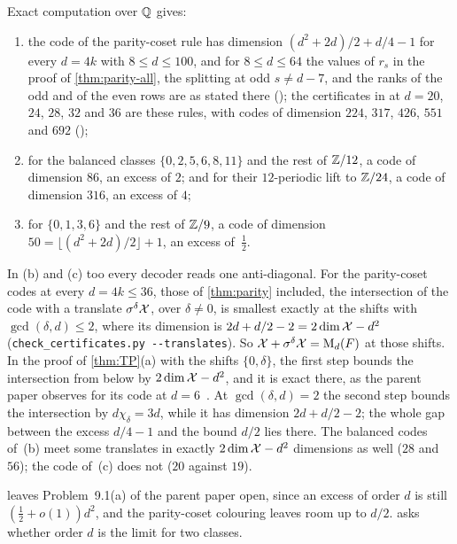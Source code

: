 \begin{remark}\label{rem:parity-numerical}
Exact computation over $\mathbb{Q}$ gives:
\begin{enumerate}[label=(\alph*),leftmargin=2em]
\item the code of the parity-coset rule has dimension $(d^2+2d)/2+d/4-1$ for every $d=4k$ with $8\le d\le100$, and
for $8\le d\le64$ the values of $r_s$ in the proof of \cref{thm:parity-all}, the splitting at odd $s\ne d-7$, and the
ranks of the odd and of the even rows are as stated there (); the certificates in  at $d=20$, $24$, $28$,
$32$ and $36$ are these rules, with codes of dimension $224$, $317$, $426$, $551$ and $692$
();
\item for the balanced classes $\{0,2,5,6,8,11\}$ and the rest of $\mathbb{Z}/12$, a code of dimension $86$, an excess of $2$;
and for their $12$-periodic lift to $\mathbb{Z}/24$, a code of dimension $316$, an excess of $4$;
\item for $\{0,1,3,6\}$ and the rest of $\mathbb{Z}/9$, a code of dimension $50=\lfloor(d^2+2d)/2\rfloor+1$, an excess
of~$\frac12$.
\end{enumerate}
In (b) and (c) too every decoder reads one anti-diagonal. For the parity-coset codes at every $d=4k\le36$, those of
\cref{thm:parity} included, the intersection of the code with a translate $\sigma^\delta\mathcal{X}$, over $\delta\ne0$, is
smallest exactly at the shifts with $\gcd(\delta,d)\le2$, where its dimension is $2d+d/2-2=2\dim\mathcal{X}-d^2$
(\texttt{check\_certificates.py -{}-translates}). So $\mathcal{X}+\sigma^\delta\mathcal{X}=\mathrm{M}_d(F)$ at those shifts. In the proof of
\cref{thm:TP}(a) with the shifts $\{0,\delta\}$, the first step bounds the intersection from below by $2\dim\mathcal{X}-d^2$,
and it is exact there, as the parent paper observes for its code at $d=6$~\cite[Section~8]{SeventeenthPaper2026}. At
$\gcd(\delta,d)=2$ the second step bounds the intersection by $d\chi_\delta=3d$, while it has dimension $2d+d/2-2$; the
whole gap between the excess $d/4-1$ and the bound $d/2$ lies there. The balanced codes of~(b) meet some translates in
exactly $2\dim\mathcal{X}-d^2$ dimensions as well ($28$ and $56$); the code of~(c) does not ($20$ against $19$).
\end{remark}

 leaves Problem~9.1(a) of the parent paper open, since an excess of order $d$ is still
$(\frac12+o(1))d^2$, and the parity-coset colouring leaves room up to $d/2$.  asks whether order
$d$ is the limit for two classes.
